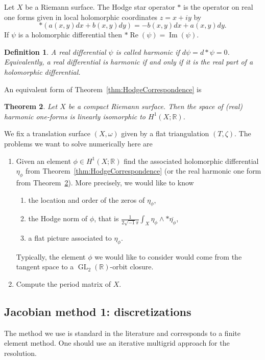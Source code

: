 \documentclass[a4paper,12pt]{article}
\def\bR{\mathbb{R}}
\def\Re{\operatorname{Re}}
\def\Im{\operatorname{Im}}
\def\GL{\operatorname{GL}}
\newtheorem{definition}{Definition}
\newtheorem{theorem}[definition]{Theorem}
\begin{document}
Let $X$ be a Riemann surface. The Hodge star operator $*$ is the operator on 
real one forms given in local holomorphic coordinates $z = x+iy$ by
\[
*(a(x,y) dx + b(x,y) dy) = -b(x,y) dx + a(x,y) dy.
\]
If $\psi$ is a holomorphic differential then $* \Re(\psi) = \Im(\psi)$.

\begin{definition}
A real differential $\psi$ is called \emph{harmonic} if $d \psi = d*\psi = 0$.
Equivalently, a real differential is harmonic if and only if it is the real
part of a holomorphic differential.
\end{definition}

An equivalent form of Theorem~\ref{thm:HodgeCorrespondence} is
\begin{theorem}
\label{thm:realHodgeCorrespondence}
Let $X$ be a compact Riemann surface. Then the space of (real) harmonic one-forms
is linearly isomorphic to $H^1(X; \bR)$.
\end{theorem}

We fix a translation surface $(X, \omega)$ given by a flat triangulation $(T,\zeta)$.
The problems we want to solve numerically here are
\begin{enumerate}
\item Given an element $\phi \in H^1(X; \bR)$ find the associated holomorphic differential
$\eta_\phi$ from Theorem~\ref{thm:HodgeCorrespondence} (or the real harmonic one form from Theorem~\ref{thm:realHodgeCorrespondence}).
More precisely, we would like to know
\begin{enumerate}
\item the location and order of the zeros of $\eta_\phi$,
\item the Hodge norm of $\phi$, that is $\frac{1}{2 \sqrt{-1} \pi} \int_X \eta_\phi \wedge * \overline{\eta_\phi}$,
\item a flat picture associated to $\eta_\phi$.
\end{enumerate}
Typically, the element $\phi$ we would like to consider would come from the tangent
space to a $\GL_2(\bR)$-orbit closure.
\item Compute the period matrix of $X$.
\end{enumerate}

\subsection{Jacobian method 1: discretizations}
The method we use is standard in the literature and corresponds to a finite element
method. One should use an iterative multigrid approach for the resolution.
\end{document}
